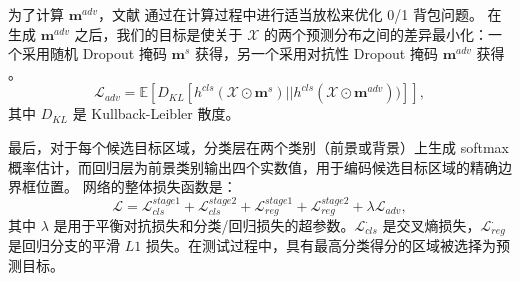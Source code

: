 为了计算 $\mathbf{m}^{adv}$，文献 \cite{park2018adversarial} 通过在计算过程中进行适当放松来优化 0/1 背包问题。
在生成 $\mathbf{m}^{adv}$ 之后，我们的目标是使关于 $\mathcal{X}$ 的两个预测分布之间的差异最小化：一个采用随机 Dropout 掩码 $\mathbf{m}^{s}$ 获得，另一个采用对抗性 Dropout 掩码 $\mathbf{m}^{adv}$ 获得 \cite{lee2019drop}。
\begin{equation}
    \mathcal{L}_{adv} = \mathbb E[D_{KL}[h^{cls}(\mathcal{X} \odot\mathbf{m}^{s})||h^{cls}(\mathcal{X} \odot\mathbf{m}^{adv}))]],
\end{equation}
其中 $D_{KL}$ 是 Kullback-Leibler 散度。

最后，对于每个候选目标区域，分类层在两个类别（前景或背景）上生成 softmax 概率估计，而回归层为前景类别输出四个实数值，用于编码候选目标区域的精确边界框位置。
网络的整体损失函数是：
\begin{equation}
\mathcal{L} = \mathcal{L}_{cls}^{stage1} + \mathcal{L}_{cls}^{stage2} + \mathcal{L}_{reg}^{stage1}+\mathcal{L}_{reg}^{stage2} +  \lambda \mathcal{L}_{adv},
\end{equation}
其中 $\lambda$ 是用于平衡对抗损失和分类/回归损失的超参数。$\mathcal{L}_{cls}^{\cdot}$ 是交叉熵损失，$\mathcal{L}_{reg}^{\cdot}$ 是回归分支的平滑 $L1$ 损失。在测试过程中，具有最高分类得分的区域被选择为预测目标。

